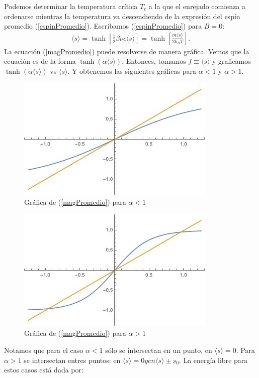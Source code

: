 \documentclass[letterpaper,12pt,oneside]{book}
\begin{document}
%
Podemos determinar la temperatura cr\'itica $T_c$ a la que el enrejado comienza a ordenarse mientras la temperatura va descendiendo de la expresi\'on del esp\'in promedio (\ref{espinPromedio}). Escribamos (\ref{espinPromedio}) para $B = 0$:
%
\begin{eqnarray}
\langle s \rangle = \tanh \left[\frac{1}{2} \beta \nu \epsilon \langle s \rangle \right] = \tanh \left[ \frac{\nu \epsilon \langle s \rangle}{2k_B T}\right]. \label{magPromedio}
\end{eqnarray}
% 
La ecuaci\'on (\ref{magPromedio}) puede resolverse de manera gr\'afica. Vemos que la ecuaci\'on es de la forma $\tanh(\alpha \langle s \rangle)$. Entonces, tomamos $f\equiv \langle s \rangle$ y graficamos $\tanh (\alpha \langle s \rangle)$ vs $\langle s \rangle$. Y obtenemos las siguientes gr\'aficas para $\alpha <1 $ y $\alpha > 1$. 
\begin{figure}
\centering
\includegraphics[scale=0.75]{fig/solucion1.jpeg}
\caption{Gr\'afica de (\ref{magPromedio}) para $\alpha < 1$ \label{meanField1}}
\end{figure}
\begin{figure}
\centering
\includegraphics[scale=0.75]{fig/solucion2.jpeg}
\caption{Gr\'afica de (\ref{magPromedio}) para $\alpha > 1$ \label{meanField2}}
\end{figure}
Notamos que para el caso $\alpha <1$ s\'olo se intersectan en un punto, en $\langle s \rangle =0$. Para $\alpha > 1$ se intersectan entres puntos: en $\langle s \rangle = 0 y en \langle s \rangle \pm s_0$. La energ\'ia libre para estos casos est\'a dada por:
\end{document}
